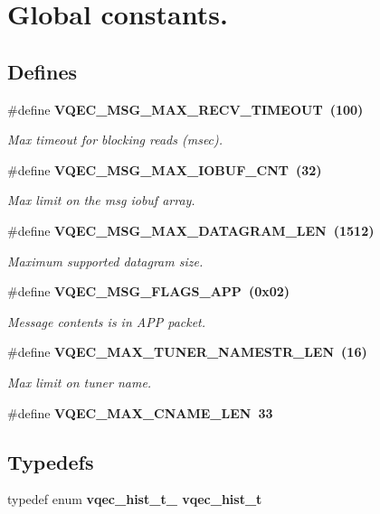 \section{Global constants.}
\label{group__gdefs}
\subsection*{Defines}
\begin{CompactItemize}
\item 
\#define \bf{VQEC\_\-MSG\_\-MAX\_\-RECV\_\-TIMEOUT}~(100)
\begin{CompactList}\small\item\em Max timeout for blocking reads (msec). \item\end{CompactList}\item 
\#define \bf{VQEC\_\-MSG\_\-MAX\_\-IOBUF\_\-CNT}~(32)
\begin{CompactList}\small\item\em Max limit on the msg iobuf array. \item\end{CompactList}\item 
\#define \bf{VQEC\_\-MSG\_\-MAX\_\-DATAGRAM\_\-LEN}~(1512)
\begin{CompactList}\small\item\em Maximum supported datagram size. \item\end{CompactList}\item 
\#define \bf{VQEC\_\-MSG\_\-FLAGS\_\-APP}~(0x02)
\begin{CompactList}\small\item\em Message contents is in APP packet. \item\end{CompactList}\item 
\#define \bf{VQEC\_\-MAX\_\-TUNER\_\-NAMESTR\_\-LEN}~(16)
\begin{CompactList}\small\item\em Max limit on tuner name. \item\end{CompactList}\item 
\#define \bf{VQEC\_\-MAX\_\-CNAME\_\-LEN}~33
\end{CompactItemize}
\subsection*{Typedefs}
\begin{CompactItemize}
\item 
typedef enum \bf{vqec\_\-hist\_\-t\_\-} \bf{vqec\_\-hist\_\-t}
\end{CompactItemize}
